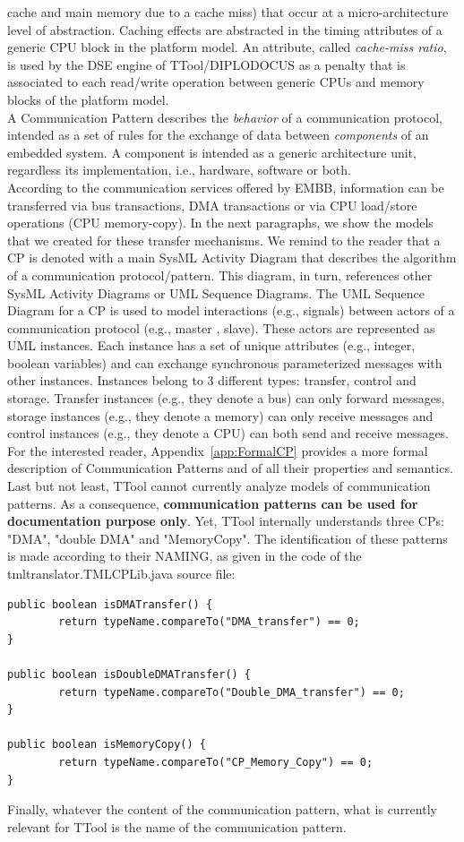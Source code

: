 \documentclass{llncs}
\begin{document}
cache and main memory due to a cache miss) that occur at a micro-architecture level of abstraction. Caching effects are
abstracted in the timing attributes of a generic CPU block in the platform model. An attribute, called
\textit{cache-miss ratio}, is used by the DSE engine of TTool/DIPLODOCUS as a penalty that is associated to each
read/write operation between generic CPUs and memory blocks of the platform model.\\
%
A Communication Pattern describes the \emph{behavior} of a communication protocol, intended as a set of rules for the
exchange of data between \emph{components} of an embedded system. A component is intended as a generic architecture
unit, regardless its implementation, i.e., hardware, software or both.\\
%
According to the communication services offered by EMBB, information can be transferred via bus transactions, DMA
transactions or via CPU load/store operations (CPU memory-copy). In the next paragraphs, we show the models that we
created for these transfer mechanisms. We remind to the reader that a CP is denoted with a main SysML Activity Diagram
that describes the algorithm of a communication protocol/pattern. This diagram, in turn, references other SysML Activity
Diagrams or UML Sequence Diagrams. The UML Sequence Diagram for a CP is used to model interactions (e.g., signals)
between actors of a communication protocol (e.g., master , slave). These actors are represented as UML instances. Each
instance has a set of unique attributes (e.g., integer, boolean variables) and can exchange synchronous parameterized
messages with other instances. Instances belong to 3 different types: transfer, control and storage. Transfer instances
(e.g., they denote a bus) can only forward messages, storage instances (e.g., they denote a memory) can only receive
messages and control instances (e.g., they denote a CPU) can both send and receive messages.\\
%
For the interested reader, Appendix~\ref{app:FormalCP} provides a more formal description of Communication Patterns and
of all their properties and semantics.\\
%
Last but not least, TTool cannot currently analyze models of communication patterns. As a consequence, \textbf{communication patterns can be used for documentation purpose only}. Yet, TTool internally understands three CPs: "DMA", "double DMA" and "MemoryCopy". The identification of these patterns is made according to their NAMING, as given in the code of the tmltranslator.TMLCPLib.java source file:
\begin{lstlisting}
public boolean isDMATransfer() {
        return typeName.compareTo("DMA_transfer") == 0;
}

public boolean isDoubleDMATransfer() {
        return typeName.compareTo("Double_DMA_transfer") == 0;
}

public boolean isMemoryCopy() {
        return typeName.compareTo("CP_Memory_Copy") == 0;
}
\end{lstlisting}
Finally, whatever the content of the communication pattern, what is currently relevant for TTool is the name of the communication pattern.
\end{document}
